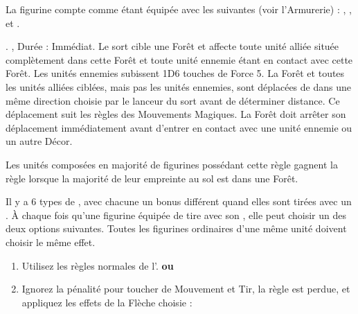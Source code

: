 \armyspecialruleentry{\masterarcher}

La figurine compte comme étant équipée avec les \feyarrows{} suivantes (voir l'Armurerie) :\newline
\truemarkarrow{}, \starlightshaft{}, \perforatingtip{} et \jewelweedshot{}.

\armyspecialruleentry{\treesinging}

. , Durée : Immédiat.\newline
Le sort cible une Forêt et affecte toute unité alliée située complètement dans cette Forêt et toute unité ennemie étant en contact avec cette Forêt. Les unités ennemies subissent 1D6 touches de Force 5. La Forêt et toutes les unités alliées ciblées, mais pas les unités ennemies, sont déplacées de  dans une même direction choisie par le lanceur du sort avant de déterminer distance. Ce déplacement suit les règles des Mouvements Magiques. La Forêt doit arrêter son déplacement immédiatement avant d'entrer en contact avec une unité ennemie ou un autre Décor.

\armyspecialruleentry{\emboldeningboughs}

Les unités composées en majorité de figurines possédant cette règle gagnent la règle \stubborn{} lorsque la majorité de leur empreinte au sol est dans une Forêt.

\closearmyspecialrules






\newpage
\startarmyarmoury

\startitemlistonecol

\listitemonecol{\feyarrows} Il y a 6 types de \feyarrows{}, avec chacune un bonus différent quand elles sont tirées avec un \longbow{}. À chaque fois qu'une figurine équipée de \feyarrows{} tire avec son \longbow{}, elle peut choisir un des deux options suivantes. Toutes les figurines ordinaires d'une même unité doivent choisir le même effet. 
\begin{enumerate}
\item Utilisez les règles normales de l'\longbow{}.\newline
\hspace*{0.5cm}\textbf{ou}
\item Ignorez la pénalité pour toucher de Mouvement et Tir, la règle \volleyfire{} est perdue, et appliquez les effets de la Flèche choisie :
\end{enumerate}

